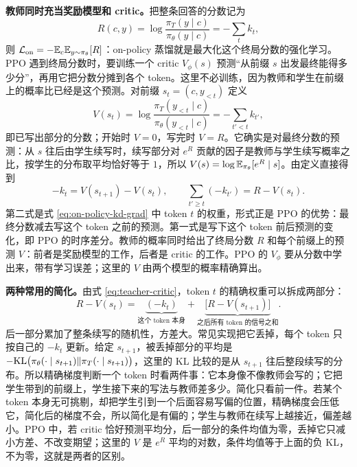 \textbf{教师同时充当奖励模型和 critic。}把整条回答的分数记为
\begin{equation}
 R(c,y)=\log\frac{\pi_T(y\mid c)}{\pi_\theta(y\mid c)}=-\sum_t k_t,
\end{equation}
则 \(\mathcal L_{\mathrm{on}}=-\mathbb{E}_c\mathbb{E}_{y\sim\pi_\theta}[R]\)：on-policy 蒸馏就是最大化这个终局分数的强化学习。PPO 遇到终局分数时，要训练一个 critic \(V_\phi(s)\) 预测“从前缀 \(s\) 出发最终能得多少分”，再用它把分数分摊到各个 token。这里不必训练，因为教师和学生在前缀上的概率比已经是这个预测。对前缀 \(s_t=(c,y_{<t})\) 定义
\begin{equation}
 V(s_t)=\log\frac{\pi_T(y_{<t}\mid c)}{\pi_\theta(y_{<t}\mid c)}=-\sum_{t'<t}k_{t'},
\end{equation}
即已写出部分的分数；开始时 \(V=0\)，写完时 \(V=R\)。它确实是对最终分数的预测：从 \(s\) 往后由学生续写时，续写部分对 \(e^R\) 贡献的因子是教师与学生续写概率之比，按学生的分布取平均恰好等于 \(1\)，所以 \(V(s)=\log\mathbb{E}_{\pi_\theta}[e^{R}\mid s]\)。由定义直接得到
\begin{equation}
 -k_t=V(s_{t+1})-V(s_t),\qquad \sum_{t'\ge t}(-k_{t'})=R-V(s_t).
 \label{eq:teacher-critic}
\end{equation}
第二式是式 \eqref{eq:on-policy-kd-grad} 中 token \(t\) 的权重，形式正是 PPO 的优势：最终分数减去写这个 token 之前的预测。第一式是写下这个 token 前后预测的变化，即 PPO 的时序差分。教师的概率同时给出了终局分数 \(R\) 和每个前缀上的预测 \(V\)：前者是奖励模型的工作，后者是 critic 的工作。PPO 的 \(V_\phi\) 要从分数中学出来，带有学习误差；这里的 \(V\) 由两个模型的概率精确算出。

\textbf{两种常用的简化。}由式 \eqref{eq:teacher-critic}，token \(t\) 的精确权重可以拆成两部分：
\begin{equation}
 R-V(s_t)=\underbrace{(-k_t)}_{\text{这个 token 本身}}+\underbrace{\bigl[R-V(s_{t+1})\bigr]}_{\text{之后所有 token 的信号之和}}.
\end{equation}
后一部分累加了整条续写的随机性，方差大。常见实现把它丢掉，每个 token 只按自己的 \(-k_t\) 更新。给定 \(s_{t+1}\)，被丢掉部分的平均是 \(-\mathrm{KL}\bigl(\pi_\theta(\cdot\mid s_{t+1})\Vert\pi_T(\cdot\mid s_{t+1})\bigr)\)，这里的 KL 比较的是从 \(s_{t+1}\) 往后整段续写的分布。所以精确梯度判断一个 token 时看两件事：它本身像不像教师会写的；它把学生带到的前缀上，学生接下来的写法与教师差多少。简化只看前一件。若某个 token 本身无可挑剔，却把学生引到一个后面容易写偏的位置，精确梯度会压低它，简化后的梯度不会，所以简化是有偏的；学生与教师在续写上越接近，偏差越小。PPO 中，若 critic 恰好预测平均分，后一部分的条件均值为零，丢掉它只减小方差、不改变期望；这里的 \(V\) 是 \(e^R\) 平均的对数，条件均值等于上面的负 KL，不为零，这就是两者的区别。

